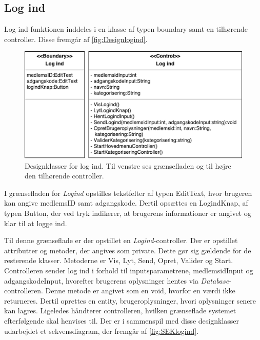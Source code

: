 \subsection*{Log ind}
Log ind-funktionen inddeles i en klasse af typen boundary samt en tilhørende controller. Disse fremgår af \autoref{fig:Designlogind}. 

\begin{figure} [H]
\centering
\includegraphics[width=1\textwidth]{figures/MVC/MVCLogInd}
\caption{Designklasser for log ind. Til venstre ses grænsefladen og til højre den tilhørende controller.}
\label{fig:Designlogind}
\end{figure}

\noindent
I grænsefladen for \textit{Logind} opstilles tekstfelter af typen EditText, hvor brugeren kan angive medlemsID samt adgangskode. Dertil opsættes en LogindKnap, af typen Button, der ved tryk indikerer, at brugerens informationer er angivet og klar til at logge ind. 

Til denne grænseflade er der opstillet en \textit{Logind}-controller. Der er opstillet attributter og metoder, der angives som private. Dette gør sig gældende for de resterende klasser. Metoderne er Vis, Lyt, Send, Opret, Valider og Start. Controlleren sender log ind i forhold til inputsparametrene, medlemsidInput og adgangskodeInput, hvorefter brugerens oplysninger hentes via \textit{Database}-controlleren. Denne metode er angivet som en void, hvorfor en værdi ikke returneres. Dertil oprettes en entity, brugeroplysninger, hvori oplysninger senere kan lagres. Ligeledes håndterer controlleren, hvilken grænseflade systemet efterfølgende skal henvises til. Der er i sammenspil med disse designklasser udarbejdet et sekvensdiagram, der fremgår af \autoref{fig:SEKlogind}.



